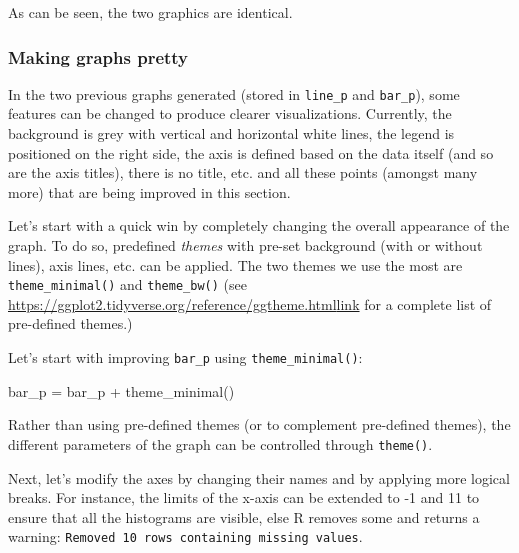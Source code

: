 \documentclass[
]{book}
\newenvironment{Shaded}{\begin{snugshade}}{\end{snugshade}}
\newcommand{\FunctionTok}[1]{\textcolor[rgb]{0.00,0.00,0.00}{#1}}
\newcommand{\NormalTok}[1]{#1}
\newcommand{\OtherTok}[1]{\textcolor[rgb]{0.56,0.35,0.01}{#1}}
\newcommand{\SpecialCharTok}[1]{\textcolor[rgb]{0.00,0.00,0.00}{#1}}
\begin{document}
As can be seen, the two graphics are identical.

\hypertarget{making-graphs-pretty}{%
\subsubsection{Making graphs pretty}\label{making-graphs-pretty}}

In the two previous graphs generated (stored in \texttt{line\_p} and \texttt{bar\_p}), some features can be changed to produce clearer visualizations. Currently, the background is grey with vertical and horizontal white lines, the legend is positioned on the right side, the axis is defined based on the data itself (and so are the axis titles), there is no title, etc. and all these points (amongst many more) that are being improved in this section.

Let's start with a quick win by completely changing the overall appearance of the graph. To do so, predefined \emph{themes} with pre-set background (with or without lines), axis lines, etc. can be applied. The two themes we use the most are \texttt{theme\_minimal()} and \texttt{theme\_bw()} (see \url{https://ggplot2.tidyverse.org/reference/ggtheme.html}\href{https://ggplot2.tidyverse.org/reference/ggtheme.html}{link} for a complete list of pre-defined themes.)

Let's start with improving \texttt{bar\_p} using \texttt{theme\_minimal()}:

\begin{Shaded}
\begin{Highlighting}[]
\NormalTok{bar\_p }\OtherTok{=}\NormalTok{ bar\_p }\SpecialCharTok{+} \FunctionTok{theme\_minimal}\NormalTok{()}
\end{Highlighting}
\end{Shaded}

Rather than using pre-defined themes (or to complement pre-defined themes), the different parameters of the graph can be controlled through \texttt{theme()}.

Next, let's modify the axes by changing their names and by applying more logical breaks. For instance, the limits of the x-axis can be extended to -1 and 11 to ensure that all the histograms are visible, else R removes some and returns a warning: \texttt{Removed\ 10\ rows\ containing\ missing\ values}.
\end{document}

